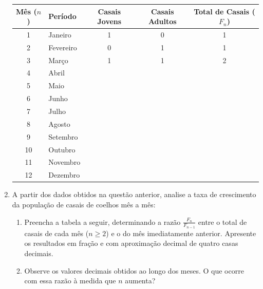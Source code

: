 \documentclass[12pt,a4paper]{article}
\begin{document}
\begin{enumerate}
		\begin{table}[h!]
			\centering
			\renewcommand{\arraystretch}{1.4}
			\begin{tabular}{|c|l|c|c|c|}
				\hline
				\textbf{Mês ($n$)} & \textbf{Período} & \textbf{Casais Jovens} & \textbf{Casais Adultos} & \textbf{Total de Casais ($F_n$)} \\ \hline
				1 & Janeiro   & 1 & 0 & 1 \\ \hline
				2 & Fevereiro & 0 & 1 & 1 \\ \hline
				3 & Março     & 1 & 1 & 2 \\ \hline
				4 & Abril     &   &   &   \\ \hline
				5 & Maio      &   &   &   \\ \hline
				6 & Junho     &   &   &   \\ \hline
				7 & Julho     &   &   &   \\ \hline
				8 & Agosto    &   &   &   \\ \hline
				9 & Setembro  &   &   &   \\ \hline
				10 & Outubro  &   &   &   \\ \hline
				11 & Novembro &   &   &   \\ \hline
				12 & Dezembro &   &   &   \\ \hline
			\end{tabular}
		\end{table}


		\item A partir dos dados obtidos na questão anterior, analise a taxa de crescimento da população de casais de coelhos mês a mês:
		
		\begin{enumerate}[label=\alph*)]
			\item Preencha a tabela a seguir, determinando a razão $\frac{F_n}{F_{n-1}}$ entre o total de casais de cada mês ($n \ge 2$) e o do mês imediatamente anterior. Apresente os resultados em fração e com aproximação decimal de quatro casas decimais.
			
			\item Observe os valores decimais obtidos ao longo dos meses. O que ocorre com essa razão à medida que $n$ aumenta?
		\end{enumerate}
		

\end{enumerate}
\end{document}
